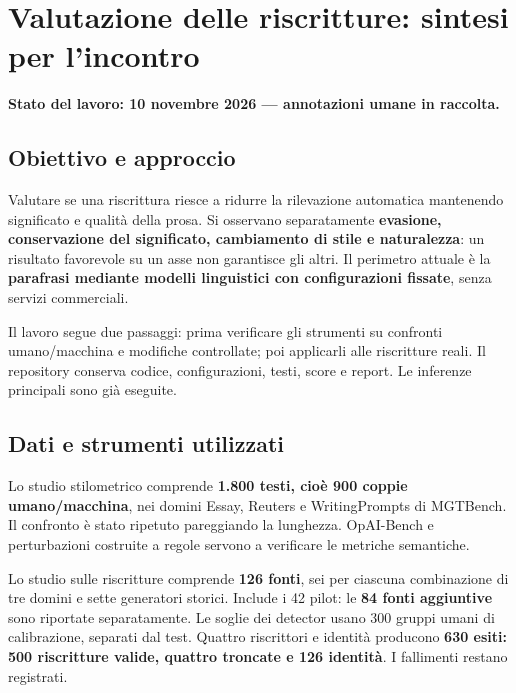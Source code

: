 \documentclass[10pt,a4paper]{article}
\begin{document}
\section{Valutazione delle riscritture: sintesi per l'incontro}\label{valutazione-delle-riscritture-sintesi-per-lincontro}

\textbf{Stato del lavoro: 10 novembre 2026 --- annotazioni umane in raccolta.}

\subsection{Obiettivo e approccio}\label{obiettivo-e-approccio}

Valutare se una riscrittura riesce a ridurre la rilevazione automatica mantenendo significato e qualità della prosa. Si osservano separatamente \textbf{evasione, conservazione del significato, cambiamento di stile e naturalezza}: un risultato favorevole su un asse non garantisce gli altri. Il perimetro attuale è la \textbf{parafrasi mediante modelli linguistici con configurazioni fissate}, senza servizi commerciali.

Il lavoro segue due passaggi: prima verificare gli strumenti su confronti umano/macchina e modifiche controllate; poi applicarli alle riscritture reali. Il repository conserva codice, configurazioni, testi, score e report. Le inferenze principali sono già eseguite.

\subsection{Dati e strumenti utilizzati}\label{dati-e-strumenti-utilizzati}

Lo studio stilometrico comprende \textbf{1.800 testi, cioè 900 coppie umano/macchina}, nei domini Essay, Reuters e WritingPrompts di MGTBench. Il confronto è stato ripetuto pareggiando la lunghezza. OpAI-Bench e perturbazioni costruite a regole servono a verificare le metriche semantiche.

Lo studio sulle riscritture comprende \textbf{126 fonti}, sei per ciascuna combinazione di tre domini e sette generatori storici. Include i 42 pilot: le \textbf{84 fonti aggiuntive} sono riportate separatamente. Le soglie dei detector usano 300 gruppi umani di calibrazione, separati dal test. Quattro riscrittori e identità producono \textbf{630 esiti: 500 riscritture valide, quattro troncate e 126 identità}. I fallimenti restano registrati.
\end{document}
